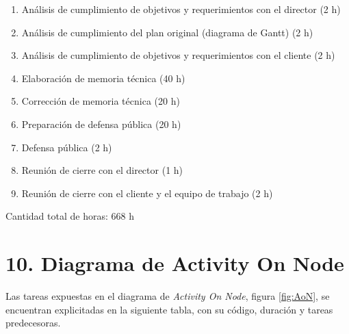 \documentclass[
11pt, %
codirector, %
]{charter}
\begin{document}
\begin{enumerate}
	\begin{enumerate}
		\item Análisis de cumplimiento de objetivos y requerimientos con el director (2 h)
		\item Análisis de cumplimiento del plan original (diagrama de Gantt) (2 h)
		\item Análisis de cumplimiento de objetivos y requerimientos con el cliente (2 h)
		\item Elaboración de memoria técnica (40 h)
		\item Corrección de memoria técnica (20 h)
		\item Preparación de defensa pública (20 h)
		\item Defensa pública (2 h)
		\item Reunión de cierre con el director (1 h)
		\item Reunión de cierre con el cliente y el equipo de trabajo (2 h)
	\end{enumerate}
\end{enumerate}

Cantidad total de horas: 668 h

\section{10. Diagrama de Activity On Node}
\label{sec:AoN}

Las tareas expuestas en el diagrama de \textit{Activity On Node}, figura \ref{fig:AoN}, se encuentran explicitadas en la siguiente tabla, con su código, duración y tareas predecesoras.
\end{document}
